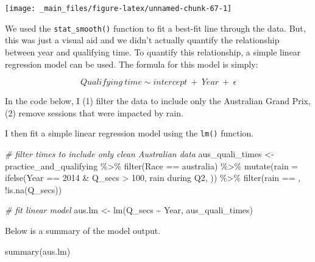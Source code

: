 \documentclass[
]{book}
\newenvironment{Shaded}{\begin{snugshade}}{\end{snugshade}}
\newcommand{\AttributeTok}[1]{\textcolor[rgb]{0.77,0.63,0.00}{#1}}
\newcommand{\CommentTok}[1]{\textcolor[rgb]{0.56,0.35,0.01}{\textit{#1}}}
\newcommand{\DecValTok}[1]{\textcolor[rgb]{0.00,0.00,0.81}{#1}}
\newcommand{\FunctionTok}[1]{\textcolor[rgb]{0.00,0.00,0.00}{#1}}
\newcommand{\NormalTok}[1]{#1}
\newcommand{\OtherTok}[1]{\textcolor[rgb]{0.56,0.35,0.01}{#1}}
\newcommand{\SpecialCharTok}[1]{\textcolor[rgb]{0.00,0.00,0.00}{#1}}
\newcommand{\StringTok}[1]{\textcolor[rgb]{0.31,0.60,0.02}{#1}}
\begin{document}
\begin{center}\texttt{[image: \_main\_files/figure-latex/unnamed-chunk-67-1]} \end{center}

We used the \texttt{stat\_smooth()} function to fit a best-fit line through the data. But, this was just a visual aid and we didn't actually quantify the relationship between year and qualifying time. To quantify this relationship, a simple linear regression model can be used. The formula for this model is simply:

\[Qualifying \ time \sim intercept \ + \ Year \ + \ \epsilon\]

In the code below, I (1) filter the data to include only the Australian Grand Prix, (2) remove sessions that were impacted by rain.

I then fit a simple linear regression model using the \texttt{lm()} function.

\begin{Shaded}
\begin{Highlighting}[]
\CommentTok{\# filter times to include only clean Australian data}
\NormalTok{aus\_quali\_times }\OtherTok{\textless{}{-}}\NormalTok{ practice\_and\_qualifying }\SpecialCharTok{\%\textgreater{}\%}
  \FunctionTok{filter}\NormalTok{(Race }\SpecialCharTok{==} \StringTok{\textquotesingle{}australia\textquotesingle{}}\NormalTok{) }\SpecialCharTok{\%\textgreater{}\%}
  \FunctionTok{mutate}\NormalTok{(}\AttributeTok{rain =} \FunctionTok{ifelse}\NormalTok{(Year }\SpecialCharTok{==} \DecValTok{2014} \SpecialCharTok{\&}\NormalTok{ Q\_secs }\SpecialCharTok{\textgreater{}} \DecValTok{100}\NormalTok{, }\StringTok{\textquotesingle{}rain during Q2\textquotesingle{}}\NormalTok{, }\StringTok{\textquotesingle{} \textquotesingle{}}\NormalTok{)) }\SpecialCharTok{\%\textgreater{}\%} 
  \FunctionTok{filter}\NormalTok{(rain }\SpecialCharTok{==} \StringTok{\textquotesingle{} \textquotesingle{}}\NormalTok{,}
         \SpecialCharTok{!}\FunctionTok{is.na}\NormalTok{(Q\_secs))}

\CommentTok{\# fit linear model}
\NormalTok{aus.lm }\OtherTok{\textless{}{-}} \FunctionTok{lm}\NormalTok{(Q\_secs }\SpecialCharTok{\textasciitilde{}}\NormalTok{ Year, aus\_quali\_times)}
\end{Highlighting}
\end{Shaded}

Below is a summary of the model output.

\begin{Shaded}
\begin{Highlighting}[]
\FunctionTok{summary}\NormalTok{(aus.lm)}
\end{Highlighting}
\end{Shaded}
\end{document}
